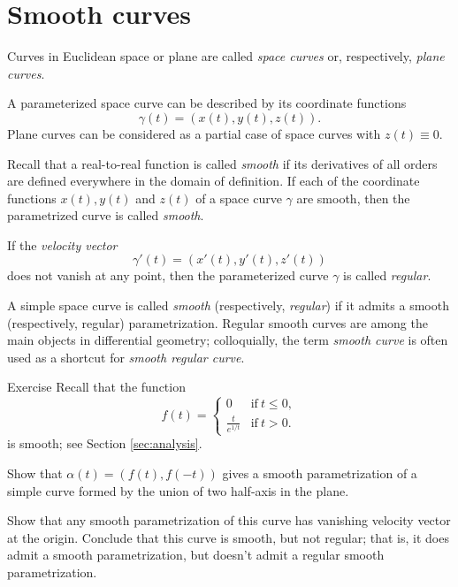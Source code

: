 \section{Smooth curves}

Curves in Euclidean space or plane are called \emph{space curves} or, respectively, \emph{plane curves}.

A parameterized space curve can be described by its coordinate functions 
\[\gamma(t)=(x(t),y(t),z(t)).\]
Plane curves can be considered as a partial case of space curves with $z(t)\equiv 0$.

Recall that a real-to-real function is called \emph{smooth} if its derivatives of all orders are defined everywhere in the domain of definition.  
If each of the coordinate functions $x(t), y(t)$ and $z(t)$ of a space curve $\gamma$ are smooth, then the parametrized curve is called \emph{smooth}.

If the \emph{velocity vector} 
\[\gamma'(t)=(x'(t),y'(t),z'(t))\] 
does not vanish at any point, then the parameterized curve $\gamma$ is called \emph{regular}.

A simple space curve is called \emph{smooth} (respectively, \emph{regular}) if it admits a smooth (respectively, regular) parametrization.
Regular smooth curves are among the main objects in differential geometry;
colloquially, the term \emph{smooth curve} is often used as a shortcut for {}\emph{smooth regular curve}. 

\begin{thm}{Exercise}\label{ex:L-shape}
Recall that the function 
\[f(t)=
\begin{cases}
0&\text{if}\ t\le 0,
\\
\frac{t}{e^{1\!/\!t}}&\text{if}\ t> 0.
\end{cases}
\]
is smooth; see Section \ref{sec:analysis}.

Show that $\alpha(t)=(f(t),f(-t))$ gives a smooth parametrization of a simple curve formed by the union of two half-axis in the plane.

Show that any smooth parametrization of this curve has vanishing velocity vector at the origin.
Conclude that this curve is smooth, but not regular;
that is, it does admit a smooth parametrization, but doesn't admit a regular smooth parametrization.
\end{thm}


